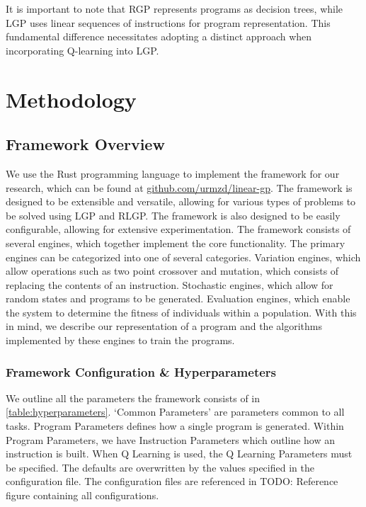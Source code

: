 \documentclass[12pt, final]{dalcsthesis}
\begin{document}
It is important to note that RGP represents programs as decision trees, while LGP uses linear sequences of instructions for program representation. This fundamental difference necessitates adopting a distinct approach when incorporating Q-learning into LGP.

\chapter{Methodology}

\section{Framework Overview}
We use the Rust programming language to implement the framework for our research, which can be found at \href{https://github.com/urmzd/linear-gp}{github.com/urmzd/linear-gp}. The framework is designed to be extensible and versatile, allowing
for various types of problems to be solved using LGP and RLGP. The framework is also designed to be easily configurable, allowing for extensive experimentation. The framework consists of several engines, which together implement the core functionality. The primary engines can be categorized into one of several categories. Variation engines, which allow operations such as two point crossover and mutation, which consists of replacing the contents of an instruction. Stochastic engines, which allow for random states and programs to be generated. Evaluation engines, which enable the system to determine the fitness of individuals within a population. With this in mind, we describe our representation of a program and the algorithms implemented by these engines to train the programs.


\subsection{Framework Configuration \& Hyperparameters}

We outline all the parameters the framework consists of in \ref{table:hyperparameters}.
`Common Parameters' are parameters common to all tasks. Program Parameters defines how a single program is generated. Within Program Parameters, we have Instruction Parameters which
outline how an instruction is built. When Q Learning is used, the Q Learning Parameters must be specified. The defaults are overwritten by the values specified in the configuration file.
The configuration files are referenced in TODO: Reference figure containing all configurations.
\end{document}
